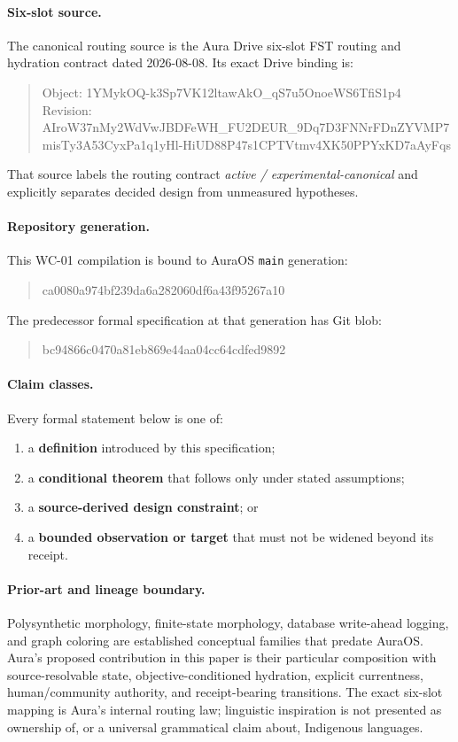 \documentclass[11pt]{article}
\begin{document}
\paragraph{Six-slot source.}
The canonical routing source is the Aura Drive six-slot FST routing and hydration
contract dated 2026-08-08.  Its exact Drive binding is:
\begin{quote}\scriptsize\ttfamily
Object: 1YMykOQ-k3Sp7VK12ltawAkO\_qS7u5OnoeWS6TfiS1p4\\
Revision: AIroW37nMy2WdVwJBDFeWH\_FU2DEUR\_9Dq7D3FNNrFDnZYVMP7\\
misTy3A53CyxPa1q1yHl-HiUD88P47s1CPTVtmv4XK50PPYxKD7aAyFqs
\end{quote}
That source labels the routing contract \emph{active / experimental-canonical}
and explicitly separates decided design from unmeasured hypotheses.

\paragraph{Repository generation.}
This WC-01 compilation is bound to AuraOS \texttt{main} generation:
\begin{quote}\footnotesize\ttfamily
ca0080a974bf239da6a282060df6a43f95267a10
\end{quote}
The predecessor formal specification at that generation has Git blob:
\begin{quote}\footnotesize\ttfamily
bc94866c0470a81eb869e44aa04cc64cdfed9892
\end{quote}

\paragraph{Claim classes.}
Every formal statement below is one of:
\begin{enumerate}[label=(\roman*)]
  \item a \textbf{definition} introduced by this specification;
  \item a \textbf{conditional theorem} that follows only under stated assumptions;
  \item a \textbf{source-derived design constraint}; or
  \item a \textbf{bounded observation or target} that must not be widened beyond its receipt.
\end{enumerate}

\paragraph{Prior-art and lineage boundary.}
Polysynthetic morphology, finite-state morphology, database write-ahead logging,
and graph coloring are established conceptual families that predate AuraOS.
Aura's proposed contribution in this paper is their particular composition with
source-resolvable state, objective-conditioned hydration, explicit currentness,
human/community authority, and receipt-bearing transitions.  The exact six-slot
mapping is Aura's internal routing law; linguistic inspiration is not presented
as ownership of, or a universal grammatical claim about, Indigenous languages.
\end{document}
